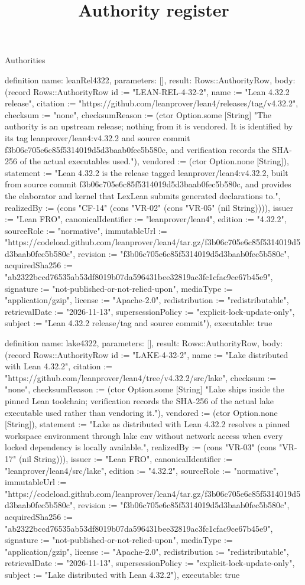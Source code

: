\begin{lexlean}{Authorities}
\title{Authority register}
\begin{semanticmodule}
definition{
  name: leanRel4322,
  parameters: [],
  result: Rows::AuthorityRow,
  body: (record Rows::AuthorityRow {id := "LEAN-REL-4-32-2", name := "Lean 4.32.2 release", citation := "https://github.com/leanprover/lean4/releases/tag/v4.32.2", checksum := "none", checksumReason := (ctor Option.some [String] "The authority is an upstream release; nothing from it is vendored. It is identified by its tag leanprover/lean4:v4.32.2 and source commit f3b06c705e6c85f5314019d5d3baab0fec5b580c, and verification records the SHA-256 of the actual executables used."), vendored := (ctor Option.none [String]), statement := "Lean 4.32.2 is the release tagged leanprover/lean4:v4.32.2, built from source commit f3b06c705e6c85f5314019d5d3baab0fec5b580c, and provides the elaborator and kernel that LexLean submits generated declarations to.", realizedBy := (cons "CF-14" (cons "VR-02" (cons "VR-05" (nil String)))), issuer := "Lean FRO", canonicalIdentifier := "leanprover/lean4", edition := "4.32.2", sourceRole := "normative", immutableUrl := "https://codeload.github.com/leanprover/lean4/tar.gz/f3b06c705e6c85f5314019d5d3baab0fec5b580c", revision := "f3b06c705e6c85f5314019d5d3baab0fec5b580c", acquiredSha256 := "ab2322bccd76535ab53df8019b07da596431bee32819ac3fc1cfac9ce67b45e9", signature := "not-published-or-not-relied-upon", mediaType := "application/gzip", license := "Apache-2.0", redistribution := "redistributable", retrievalDate := "2026-11-13", supersessionPolicy := "explicit-lock-update-only", subject := "Lean 4.32.2 release/tag and source commit"}),
  executable: true
}

definition{
  name: lake4322,
  parameters: [],
  result: Rows::AuthorityRow,
  body: (record Rows::AuthorityRow {id := "LAKE-4-32-2", name := "Lake distributed with Lean 4.32.2", citation := "https://github.com/leanprover/lean4/tree/v4.32.2/src/lake", checksum := "none", checksumReason := (ctor Option.some [String] "Lake ships inside the pinned Lean toolchain; verification records the SHA-256 of the actual lake executable used rather than vendoring it."), vendored := (ctor Option.none [String]), statement := "Lake as distributed with Lean 4.32.2 resolves a pinned workspace environment through lake env without network access when every locked dependency is locally available.", realizedBy := (cons "VR-03" (cons "VR-17" (nil String))), issuer := "Lean FRO", canonicalIdentifier := "leanprover/lean4/src/lake", edition := "4.32.2", sourceRole := "normative", immutableUrl := "https://codeload.github.com/leanprover/lean4/tar.gz/f3b06c705e6c85f5314019d5d3baab0fec5b580c", revision := "f3b06c705e6c85f5314019d5d3baab0fec5b580c", acquiredSha256 := "ab2322bccd76535ab53df8019b07da596431bee32819ac3fc1cfac9ce67b45e9", signature := "not-published-or-not-relied-upon", mediaType := "application/gzip", license := "Apache-2.0", redistribution := "redistributable", retrievalDate := "2026-11-13", supersessionPolicy := "explicit-lock-update-only", subject := "Lake distributed with Lean 4.32.2"}),
  executable: true
}


\end{semanticmodule}
\end{lexlean}
